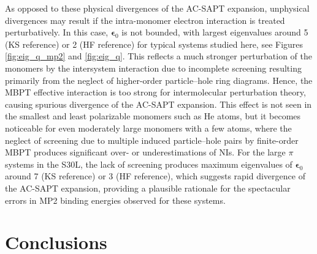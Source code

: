 \documentclass[journal=jctcce,manuscript=article]{achemso}
\begin{document}
As opposed to these physical divergences of the AC-SAPT expansion,
unphysical divergences may result if the intra-monomer electron
interaction is treated perturbatively. In this case, 
$\boldsymbol{\epsilon}_{0}$ is not bounded, with largest eigenvalues
around 5 (KS reference) or 2 (HF reference) for typical systems studied
here, see Figures \ref{fig:eig_q_mp2} and \ref{fig:eig_q}. This reflects
a much stronger perturbation of the monomers by the intersystem
interaction due to incomplete screening resulting primarily from the
neglect of higher-order particle--hole ring diagrams. Hence, the MBPT
effective interaction is too strong for intermolecular perturbation
theory, causing spurious divergence of the AC-SAPT expansion. This effect
is not seen in the smallest and least polarizable monomers 
such as He atoms, but it becomes noticeable for even moderately large
monomers with a few atoms, where the neglect of screening due to
multiple induced particle--hole pairs by finite-order MBPT produces
significant over- or underestimations of NIs. For the large $\pi$
systems in the S30L, the lack of screening produces maximum eigenvalues
of $\boldsymbol{\epsilon}_{0}$ around 7 (KS reference) or 3 (HF
reference), which suggests rapid divergence of the AC-SAPT expansion,
providing a plausible rationale for the spectacular errors in MP2
binding energies observed for these systems.

\section{Conclusions}
\label{sec:conclusions}
\end{document}
